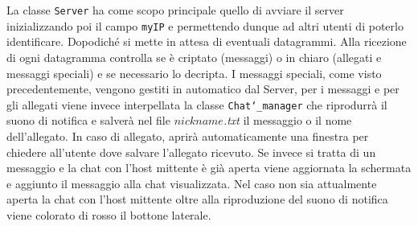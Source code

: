 La classe \texttt{Server} ha come scopo principale quello di avviare il server
inizializzando poi il campo \texttt{myIP} e permettendo dunque ad altri utenti di poterlo identificare.
Dopodiché si mette in attesa di eventuali datagrammi. Alla ricezione di ogni datagramma controlla se
è criptato (messaggi) o in chiaro (allegati e messaggi speciali) e se necessario lo decripta. 
I messaggi speciali, come visto precedentemente, vengono gestiti in automatico dal Server, per i
messaggi e per gli allegati viene invece interpellata la classe \texttt{Chat\char`_manager} che riprodurrà
il suono di notifica e salverà nel file \emph{$nickname$.txt} il messaggio o il nome dell'allegato. In caso di 
allegato, aprirà automaticamente una finestra per chiedere all'utente dove salvare l'allegato ricevuto.
Se invece si tratta di un messaggio e la chat con l'host mittente è già aperta viene aggiornata la schermata e 
aggiunto il messaggio alla chat visualizzata. Nel caso non sia attualmente aperta la chat con l'host
mittente oltre alla riproduzione del suono di notifica viene colorato di rosso il bottone laterale.